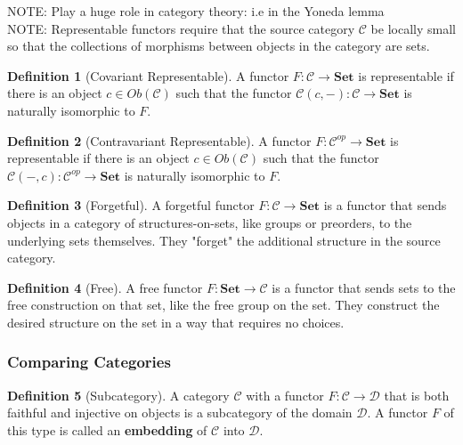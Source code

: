 \documentclass{article}
\theoremstyle{definition}
\newtheorem{definition}{Definition}
\begin{document}
NOTE: Play a huge role in category theory: i.e in the Yoneda lemma\\
NOTE: Representable functors require that the source category $\mathcal{C}$ be locally small so that the collections of morphisms between objects in the category are sets.
\begin{definition}[Covariant Representable]
    A functor $F:\mathcal{C}\rightarrow\mathbf{Set}$ is representable if there is an object $c\in Ob(\mathcal{C})$ such that the functor $\mathcal{C}(c,-):\mathcal{C}\rightarrow \mathbf{Set}$ is naturally isomorphic to $F$.
\end{definition}


\begin{definition}[Contravariant Representable]
    A functor $F:\mathcal{C}^{op}\rightarrow\mathbf{Set}$ is representable if there is an object $c\in Ob(\mathcal{C})$ such that the functor $\mathcal{C}(-,c):\mathcal{C}^{op}\rightarrow \mathbf{Set}$ is naturally isomorphic to $F$.
\end{definition}


\begin{definition}[Forgetful]
    A forgetful functor $F:\mathcal{C}\rightarrow\mathbf{Set}$ is a functor that sends objects in a category of structures-on-sets, like groups or preorders, to the underlying sets themselves.
    They "forget" the additional structure in the source category.
\end{definition}

\begin{definition}[Free]
    A free functor $F:\mathbf{Set}\rightarrow\mathcal{C}$ is a functor that sends sets to the free construction on that set, like the free group on the set.
    They construct the desired structure on the set in a way that requires no choices.
\end{definition}



\subsubsection*{Comparing Categories}

\begin{definition}[Subcategory]
    A category $\mathcal{C}$ with a functor $F:\mathcal{C}\rightarrow\mathcal{D}$ that is both faithful and injective on objects is a subcategory of the domain $\mathcal{D}$.
    A functor $F$ of this type is called an \textbf{embedding} of $\mathcal{C}$ into $\mathcal{D}$.
\end{definition}
\end{document}
